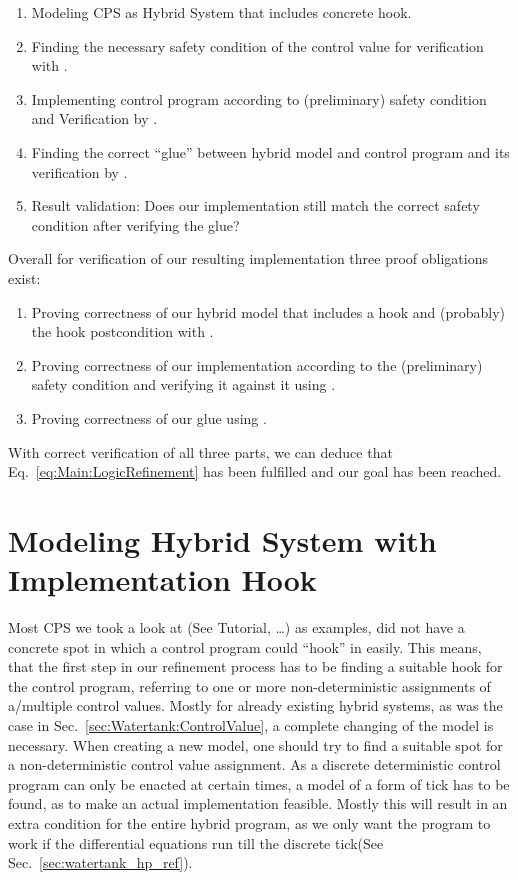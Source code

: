 \begin{enumerate}
	\item Modeling CPS as Hybrid System that includes concrete hook.
	\item Finding the necessary safety condition of the control value for verification with \keym.
	\item Implementing control program according to (preliminary) safety condition and Verification by \key.		
	\item Finding the correct ``glue'' between hybrid model and control program and its verification by \keym.
	\item Result validation: Does our implementation still match the correct safety condition after verifying the glue?
\end{enumerate}

Overall for verification of our resulting implementation three proof obligations exist:
\begin{enumerate}[label=\roman*]
	\item Proving correctness of our hybrid model that includes a hook and (probably) the hook postcondition with \keym.
	\item Proving correctness of our implementation according to the (preliminary) safety condition and verifying it against it using \key.
	\item Proving correctness of our glue using \keym.
\end{enumerate} 

With correct verification of all three parts, we can deduce that Eq.~\ref{eq:Main:LogicRefinement} has been fulfilled and our goal has been reached.

\section{Modeling Hybrid System with Implementation Hook}
\label{sec:Process:Hook}
Most CPS we took a look at (See \cite{keymaera} Tutorial, \cite[p.~5, p.~11]{platzer2010b} \dots) as examples, did not have a concrete spot in which a control program could ``hook'' in easily. This means, that the first step in our refinement process has to be finding a suitable hook for the control program, referring to one or more non-deterministic assignments of a/multiple control values. Mostly for already existing hybrid systems, as was the case in Sec.~\ref{sec:Watertank:ControlValue}, a complete changing of the model is necessary. When creating a new model, one should try to find a suitable spot for a non-deterministic control value assignment. As a discrete deterministic control program can only be enacted at certain times, a model of a form of tick has to be found, as to make an actual implementation feasible. Mostly this will result in an extra condition for the entire hybrid program, as we only want the program to work if the differential equations run till the discrete tick(See Sec.~\ref{sec:watertank_hp_ref}).

